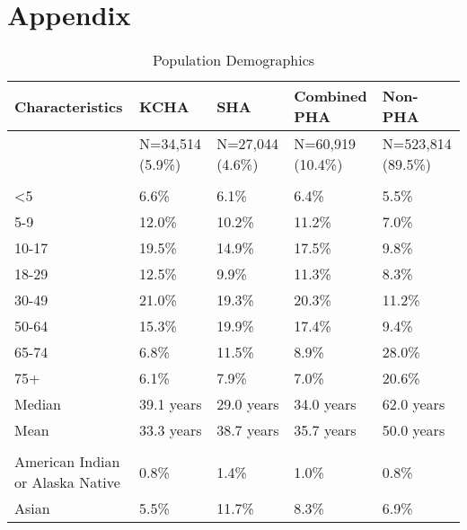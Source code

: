 \documentclass [11pt, proquest] {uwthesis}[2015/03/03]
\begin{document}
\chapter*{Appendix}\label{appendix}
\begin{table}

\caption{\label{tab:table1}Population Demographics}
\centering
\fontsize{12}{14}\selectfont
\begin{tabu} to 
\toprule
Characteristics & KCHA & SHA & Combined PHA & Non-PHA\\
\midrule
 & N=34,514 (5.9\%) & N=27,044  (4.6\%) & N=60,919  (10.4\%) & N=523,814 (89.5\%)\\
\addlinespace[0.3em]
\\
\hspace{1em}<5 & 6.6\% & 6.1\% & 6.4\% & 5.5\%\\
\hspace{1em}5-9 & 12.0\% & 10.2\% & 11.2\% & 7.0\%\\
\hspace{1em}10-17 & 19.5\% & 14.9\% & 17.5\% & 9.8\%\\
\hspace{1em}18-29 & 12.5\% & 9.9\% & 11.3\% & 8.3\%\\
\hspace{1em}30-49 & 21.0\% & 19.3\% & 20.3\% & 11.2\%\\
\hspace{1em}50-64 & 15.3\% & 19.9\% & 17.4\% & 9.4\%\\
\hspace{1em}65-74 & 6.8\% & 11.5\% & 8.9\% & 28.0\%\\
\hspace{1em}75+ & 6.1\% & 7.9\% & 7.0\% & 20.6\%\\
\hspace{1em}Median & 39.1 years & 29.0 years & 34.0 years & 62.0 years\\
\hspace{1em}Mean & 33.3 years & 38.7 years & 35.7 years & 50.0 years\\
\addlinespace[0.3em]
\\
\hspace{1em}American Indian or Alaska Native & 0.8\% & 1.4\% & 1.0\% & 0.8\%\\
\hspace{1em}Asian & 5.5\% & 11.7\% & 8.3\% & 6.9\%\\

\end{tabu}
\end{table}
\end{document}
